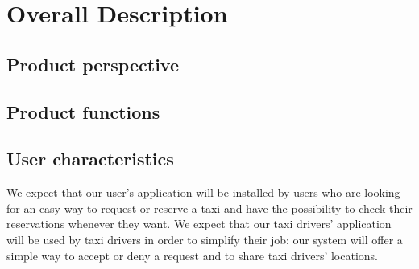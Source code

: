 \documentclass{article}
\begin{document}
\newpage
\section{Overall Description}
	\subsection{Product perspective}
	
	\subsection{Product functions}
	
	\subsection{User characteristics}
    	We expect that our user's application will be installed by users who are looking for an easy way to request or reserve a taxi and have the possibility to check their reservations whenever they want. \newline
    	We expect that our taxi drivers' application will be used by taxi drivers in order to simplify their job: our system will offer a simple way to accept or deny a request and to share taxi drivers' locations.
	
\end{document}
